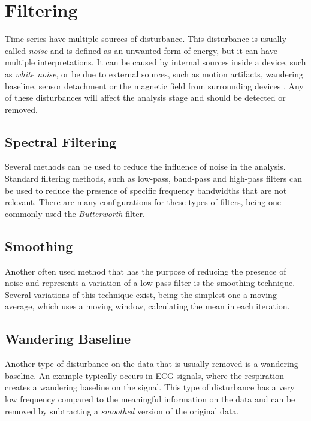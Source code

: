 \section{Filtering}
\label{sec:filt}

Time series have multiple sources of disturbance. This disturbance is usually called \textit{noise} and is defined as an unwanted form of energy, but it can have multiple interpretations. It can be caused by internal sources inside a device, such as \textit{white noise}, or be due to external sources, such as motion artifacts, wandering baseline, sensor detachment or the magnetic field from surrounding devices \cite{}. Any of these disturbances will affect the analysis stage and should be detected or removed.

\subsection{Spectral Filtering}
\label{subsec:spec_filt}
Several methods can be used to reduce the influence of noise in the analysis. Standard filtering methods, such as low-pass, band-pass and high-pass filters can be used to reduce the presence of specific frequency bandwidths that are not relevant. There are many configurations for these types of filters, being one commonly used the \textit{Butterworth} filter.

\subsection{Smoothing}
\label{subsec:smooth}

Another often used method that has the purpose of reducing the presence of noise and represents a variation of a low-pass filter is the smoothing technique. Several variations of this technique exist, being the simplest one a moving average, which uses a moving window, calculating the mean in each iteration.

\subsection{Wandering Baseline}
\label{subsec:w_baseline}

Another type of disturbance on the data that is usually removed is a wandering baseline. An example typically occurs in ECG signals, where the respiration creates a wandering baseline on the signal. This type of disturbance has a very low frequency compared to the meaningful information on the data and can be removed by subtracting a \textit{smoothed} version of the original data.

